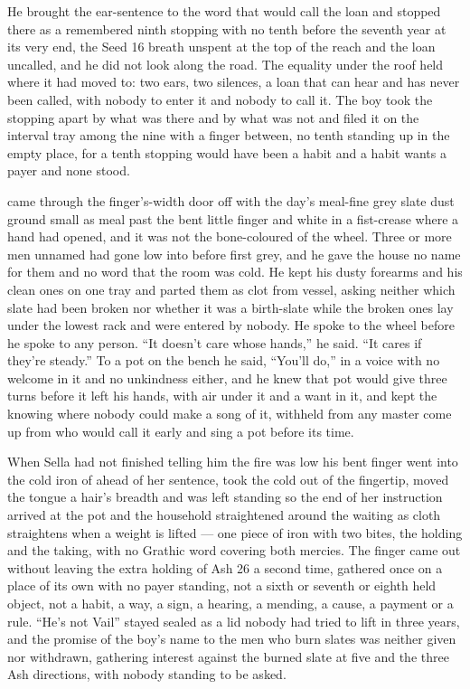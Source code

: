 He brought the ear-sentence to the word that would call the loan and stopped there as a remembered ninth stopping with no tenth before the seventh year at its very end, the Seed 16 breath unspent at the top of the reach and the loan uncalled, and he did not look along the road. The equality under the roof held where it had moved to: two ears, two silences, a loan that can hear and has never been called, with nobody to enter it and nobody to call it. The boy took the stopping apart by what was there and by what was not and filed it on the interval tray among the nine with a finger between, no tenth standing up in the empty place, for a tenth stopping would have been a habit and a habit wants a payer and none stood.

\scenebreak

 came through the finger's-width door off  with the day's meal-fine grey slate dust ground small as meal past the bent little finger and white in a fist-crease where a hand had opened, and it was not the bone-coloured  of the wheel. Three or more men unnamed had gone low into  before first grey, and he gave the house no name for them and no word that the room was cold. He kept his dusty forearms and his clean ones on one tray and parted them as clot from vessel, asking neither which slate had been broken nor whether it was a birth-slate while the broken ones lay under the lowest rack and were entered by nobody. He spoke to the wheel before he spoke to any person. “It doesn't care whose hands,” he said. “It cares if they're steady.” To a pot on the bench he said, “You'll do,” in a voice with no welcome in it and no unkindness either, and he knew  that pot would give three turns before it left his hands, with air under it and a want in it, and kept the knowing where nobody could make a song of it, withheld from any master come up from  who would call it early and sing a pot before its time.

When Sella had not finished telling him the fire was low his bent finger went into the cold iron of  ahead of her sentence, took the cold out of the fingertip, moved the tongue a hair's breadth and was left standing so the end of her instruction arrived at the pot and the household straightened around the waiting as cloth straightens when a weight is lifted — one piece of iron with two bites, the holding and the taking, with no Grathic word covering both mercies. The finger came out without leaving the extra holding of Ash 26 a second time, gathered once on a place of its own with no payer standing, not a sixth or seventh or eighth held object, not a habit, a way, a sign, a hearing, a mending, a cause, a payment or a rule. “He's not Vail” stayed sealed as a lid nobody had tried to lift in three years, and the promise of the boy's name to the men who burn slates was neither given nor withdrawn, gathering interest against the burned slate at five and the three Ash directions, with nobody standing to be asked.

